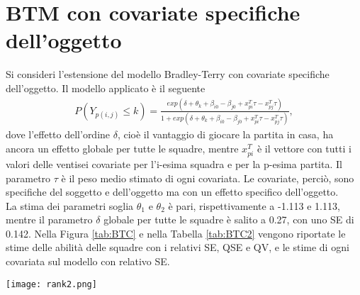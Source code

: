 \section{BTM con covariate specifiche dell'oggetto}
Si consideri l'estensione del modello Bradley-Terry con covariate specifiche dell'oggetto. Il modello applicato è il seguente
\begin{align}
	P(Y_{p(i,j)}\leq k) =  \frac{exp(\delta + \theta_{k} + \beta_{i0} - \beta_{j0} + x^T_{pi}\tau - x^T_{pj}\tau)}{1 + exp(\delta + \theta_{k} + \beta_{i0} - \beta_{j0} + x^T_{pi}\tau - x^T_{pj}\tau)}, \label{for:5.1}
\end{align}
dove l'effetto dell'ordine $\delta$, cioè il vantaggio di giocare la partita in casa, ha ancora un effetto globale per tutte le squadre, mentre $x^T_{pi}$ è il vettore con tutti i valori delle ventisei covariate per l'i-esima squadra e per la p-esima partita. Il parametro $\tau$ è il peso medio stimato di ogni covariata. Le covariate, perciò, sono specifiche del soggetto e dell'oggetto ma con un effetto specifico dell'oggetto.\\
La stima dei parametri soglia $\theta_1$ e $\theta_2$ è pari, rispettivamente a -1.113 e 1.113, mentre il parametro $\delta$ globale per tutte le squadre è salito a 0.27, con uno SE di 0.142. Nella Figura \ref{tab:BTC} e nella Tabella \ref{tab:BTC2} vengono riportate le stime delle abilità delle squadre con i relativi SE, QSE e QV, e le stime di ogni covariata sul modello con relativo SE.\\%
	\begin{sidewaysfigure} 
	\centering
	{\texttt{[image: rank2.png]}}\qquad\qquad 
	\caption{Barplot che indica per ogni squadra l'abilità stimata dal modello (\ref{for:5.1}). A fianco al grafico vengono riportati i relativi \emph{Standard 
			Error} (SE), \emph{Quasi Standard Error} (QSE) e \emph{Quasi Variance} (QV). Nel grafico viene indicato con un asterisco le squadre con un piazzamento stimato diverso da quello reale, anche esso riportato a destra del grafico} \label{tab:BTC}  
	
	
\end{sidewaysfigure}

